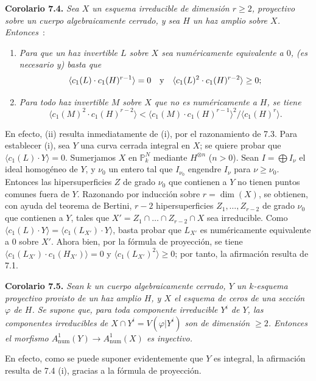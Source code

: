 \textbf{Corolario 7.4.} \emph{Sea $X$ un esquema irreducible de dimensión $r\geq2$, proyectivo sobre un cuerpo algebraicamente cerrado, y sea $H$ un haz amplio sobre $X$. Entonces}~:
\begin{enumerate}[label=(\roman*)]
\item \emph{Para que un haz invertible $L$ sobre $X$ sea numéricamente equivalente a $0$, (es necesario y) basta que}
\[
   \langle c_1(L)\cdot c_1(H)^{r-1}\rangle=0
   \quad\hbox{y}\quad
   \langle c_1(L)^2\cdot c_1(H)^{r-2}\rangle\geq0;
\]
\item \emph{Para todo haz invertible $M$ sobre $X$ que no es numéricamente  a $H$, se tiene} %
\[
   \langle c_1(M)^2\cdot c_1(H)^{r-2}\rangle
   <
   \langle c_1(M)\cdot c_1(H)^{r-1}\rangle^2/\langle c_1(H)^r\rangle.
\]
\end{enumerate}
En efecto, (ii) resulta inmediatamente de (i), por el razonamiento de 7.3. Para establecer (i), sea $Y$ una curva cerrada integral en $X$; se quiere probar que $\langle c_1(L)\cdot Y\rangle=0$. Sumerjamos $X$ en $\mathbb P^N_k$ mediante $H^{\otimes n}$ ($n>0$). Sean $I=\bigoplus I_\nu$ el ideal homogéneo de $Y$, y $\nu_0$ un entero tal que $I_{\nu_0}$ engendre $I_\nu$ para $\nu\geq\nu_0$. Entonces las hipersuperficies $Z$ de grado $\nu_0$ que contienen a $Y$ no tienen puntos comunes fuera de $Y$. Razonando por inducción sobre $r=\dim(X)$, se obtienen, con ayuda del teorema de Bertini, $r-2$ hipersuperficies $Z_1,\ldots,Z_{r-2}$ de grado $\nu_0$ que contienen a $Y$, tales que $X'=Z_1\cap\ldots\cap Z_{r-2}\cap X$ sea irreducible. Como $\langle c_1(L)\cdot Y\rangle=\langle c_1(L_{X'})\cdot Y\rangle$, basta probar que $L_{X'}$ es numéricamente equivalente a $0$ sobre $X'$. Ahora bien, por la fórmula de proyección, se tiene $\langle c_1(L_{X'})\cdot c_1(H_{X'})\rangle=0$ y $\langle c_1(L_{X'})^2\rangle\geq0$; por tanto, la afirmación resulta de 7.1.

\textbf{Corolario 7.5.} \emph{Sean $k$ un cuerpo algebraicamente cerrado, $Y$ un $k$-esquema proyectivo provisto de un haz amplio $H$, y $X$ el esquema de ceros de una sección $\varphi$ de $H$. Se supone que, para toda componente irreducible $Y^i$ de $Y$, las componentes irreducibles de $X\cap Y^i=V(\varphi|Y^i)$ son de dimensión $\geq2$. Entonces el morfismo $A^1_{\mathrm{num}}(Y)\longrightarrow A^1_{\mathrm{num}}(X)$ es inyectivo.}

En efecto, como se puede suponer evidentemente que $Y$ es integral, la afirmación resulta de 7.4 (i), gracias a la fórmula de proyección.

